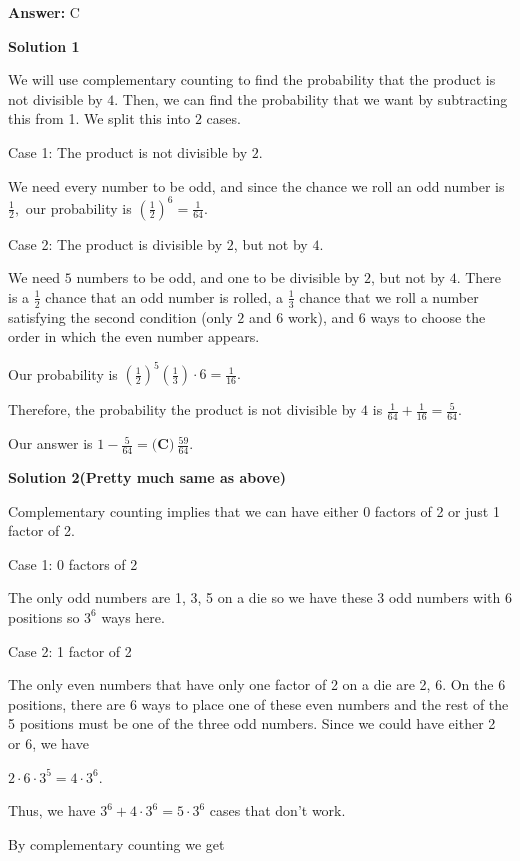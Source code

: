 \begin{enumerate}
 \textbf{Answer: }C



\textbf{Solution 1}

We will use complementary counting to find the probability that the product is not divisible by $4$. Then, we can find the probability that we want by subtracting this from 1. We split this into $2$ cases. 

 Case 1: The product is not divisible by $2$.

 We need every number to be odd, and since the chance we roll an odd number is $\frac12,$ our probability is $\left(\frac12\right)^6=\frac1{64}.$

 Case 2: The product is divisible by $2$, but not by $4$.

 We need $5$ numbers to be odd, and one to be divisible by $2$, but not by $4$. There is a $\frac12$ chance that an odd number is rolled, a $\frac13$ chance that we roll a number satisfying the second condition (only $2$ and $6$ work), and $6$ ways to choose the order in which the even number appears.

 Our probability is $\left(\frac12\right)^5\left(\frac13\right)\cdot6=\frac1{16}.$

 Therefore, the probability the product is not divisible by $4$ is $\frac1{64}+\frac1{16}=\frac{5}{64}$.

 Our answer is $1-\frac{5}{64}=\boxed{\textbf{(C)}\ \frac{59}{64}}$.

 



\textbf{Solution 2(Pretty much same as above)}

Complementary counting implies that we can have either 0 factors of 2 or just 1 factor of 2.

 Case 1: 0 factors of 2

 The only odd numbers are 1, 3, 5 on a die so we have these 3 odd numbers with 6 positions so $3^6$ ways here.

 Case 2: 1 factor of 2

 The only even numbers that have only one factor of 2 on a die are 2, 6. On the 6 positions, there are 6 ways to place one of these even numbers and the rest of the 5 positions must be one of the three odd numbers. Since we could have either 2 or 6, we have

 $2 \cdot 6 \cdot 3^5 = 4 \cdot 3^6$. 

 Thus, we have $3^6 + 4 \cdot 3^6 = 5 \cdot 3^6$ cases that don't work.

 By complementary counting we get


\end{enumerate}
